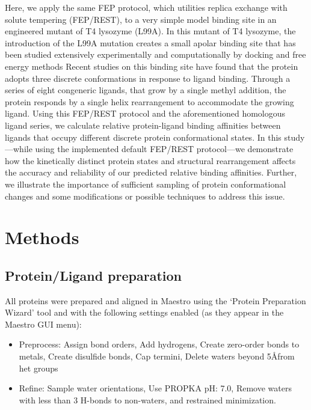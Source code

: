 \documentclass[journal=jctcce,manuscript=article]{achemso}
\begin{document}
Here, we apply the same FEP protocol, which utilities replica exchange with solute tempering (FEP/REST)\cite{FEP/REST}, to a very simple model binding site in an engineered mutant of T4 lysozyme (L99A).
In this mutant of T4 lysozyme, the introduction of the L99A mutation creates a small apolar binding site that has been studied extensively experimentally\cite{eriksson1992response,eriksson1993similar,T4affinity,doi:10.1021/bi00027a007} and computationally by docking\cite{wei2002model,wei2004testing,graves2005decoys,Merski2015} and free energy methods\cite{Mobley20071118,hermans1997inclusion,boresch2003absolute,deng2006calculation,mann2000modeling,Boyce2009,FEP/REST,FEP/RESTapp}
Recent studies on this binding site have found that the protein adopts three discrete conformations in response to ligand binding.
Through a series of eight congeneric ligands, that grow by a single methyl addition, the protein responds by a single helix rearrangement to accommodate the growing ligand\cite{Merski2015}.
Using this FEP/REST protocol and the aforementioned homologous ligand series, we calculate relative protein-ligand binding affinities between ligands that occupy different discrete protein conformational states.
In this study---while using the implemented default FEP/REST protocol---we demonstrate how the kinetically distinct protein states and structural rearrangement affects the accuracy and reliability of our predicted relative binding affinities.
Further, we illustrate the importance of sufficient sampling of protein conformational changes and some modifications or possible techniques to address this issue.

\section{Methods}
\subsection*{Protein/Ligand preparation}
All proteins were prepared and aligned in Maestro\cite{Maestro} using the `Protein Preparation Wizard'\cite{ProteinPrepWizSoftware,Epik,Impact,Prime,ProteinPrepWizPaper} tool and with the following settings enabled (as they appear in the Maestro GUI menu):
   \begin{itemize}
   \item Preprocess: Assign bond orders, Add hydrogens, Create zero-order bonds to metals, Create disulfide bonds, Cap termini, Delete waters beyond 5\AA  from het groups
   \item Refine: Sample water orientations, Use PROPKA pH: 7.0, Remove waters with less than 3 H-bonds to non-waters, and restrained minimization.
   \end{itemize}
\end{document}
